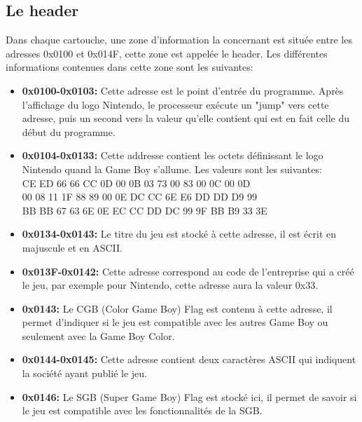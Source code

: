 \documentclass{report}
\begin{document}
\subsection{Le header}
Dans chaque cartouche, une zone d'information la concernant est située entre les adresses 0x0100 et 0x014F, cette zone est appelée le header. Les différentes informations contenues dans cette zone sont les suivantes:\\

\begin{itemize}

\item \textbf{0x0100-0x0103:} Cette adresse est le point d'entrée du programme. Après l'affichage du logo Nintendo, le processeur exécute un "jump" vers cette adresse, puis un second vers la valeur qu'elle contient qui est en fait celle du début du programme.\\

\item \textbf{0x0104-0x0133:} Cette addresse contient les octets définissant le logo Nintendo quand la Game Boy s'allume. Les valeurs sont les suivantes:
\\CE ED 66 66 CC 0D 00 0B 03 73 00 83 00 0C 00 0D
\\00 08 11 1F 88 89 00 0E DC CC 6E E6 DD DD D9 99
\\BB BB 67 63 6E 0E EC CC DD DC 99 9F BB B9 33 3E\\

\item \textbf{0x0134-0x0143:} Le titre du jeu est stocké à cette adresse, il est écrit en majuscule et en ASCII.\\

\item \textbf{0x013F-0x0142:} Cette adresse correspond au code de l'entreprise qui a créé le jeu, par exemple pour Nintendo, cette adresse aura la valeur 0x33.\\

\item \textbf{0x0143:} Le CGB (Color Game Boy) Flag est contenu à cette adresse, il permet d'indiquer si le jeu est compatible avec les autres Game Boy ou seulement avec la Game Boy Color.\\

\item \textbf{0x0144-0x0145:} Cette adresse contient deux caractères ASCII qui indiquent la société ayant publié le jeu.\\

\item \textbf{0x0146:} Le SGB (Super Game Boy) Flag est stocké ici, il permet de savoir si le jeu est compatible avec les fonctionnalités de la SGB.\\


\end{itemize}
\end{document}
